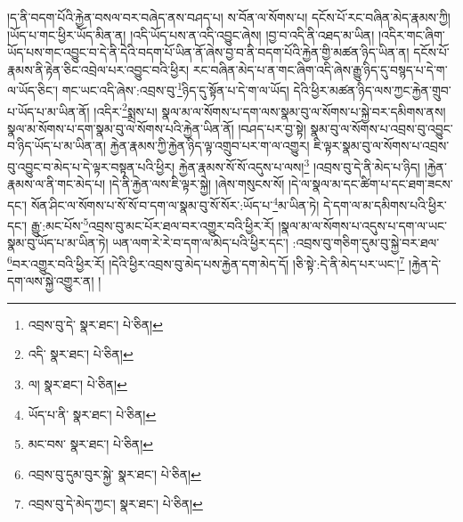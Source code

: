 །ད་ནི་བདག་པོའི་རྐྱེན་བསལ་བར་བཞེད་ནས་བཤད་པ། ས་བོན་ལ་སོགས་པ། དངོས་པོ་རང་བཞིན་མེད་རྣམས་ཀྱི། །ཡོད་པ་གང་ཕྱིར་ཡོད་མིན་ན། །འདི་ཡོད་པས་ན་འདི་འབྱུང་ཞེས། །བྱ་བ་འདི་ནི་འཐད་མ་ཡིན། །འདིར་གང་ཞིག་ཡོད་པས་གང་འབྱུང་བ་དེ་ནི་དེའི་བདག་པོ་ཡིན་ནོ་ཞེས་བྱ་བ་ནི་བདག་པོའི་རྐྱེན་གྱི་མཚན་ཉིད་ཡིན་ན། དངོས་པོ་རྣམས་ནི་རྟེན་ཅིང་འབྲེལ་པར་འབྱུང་བའི་ཕྱིར། རང་བཞིན་མེད་པ་ན་གང་ཞིག་འདི་ཞེས་རྒྱུ་ཉིད་དུ་བསྙད་པ་དེ་ག་ལ་ཡོད་ཅིང་། གང་ཡང་འདི་ཞེས་:འབྲས་བུ་\footnote{འབྲས་བུ་དེ་  སྣར་ཐང་།  པེ་ཅིན། }ཉིད་དུ་སྟོན་པ་དེ་ག་ལ་ཡོད། དེའི་ཕྱིར་མཚན་ཉིད་ལས་ཀྱང་རྐྱེན་གྲུབ་པ་ཡོད་པ་མ་ཡིན་ནོ། །འདིར་\footnote{འདི་  སྣར་ཐང་།  པེ་ཅིན། }སྨྲས་པ། སྣལ་མ་ལ་སོགས་པ་དག་ལས་སྣམ་བུ་ལ་སོགས་པ་སྐྱེ་བར་དམིགས་ནས། སྣལ་མ་སོགས་པ་དག་སྣམ་བུ་ལ་སོགས་པའི་རྐྱེན་ཡིན་ནོ། །བཤད་པར་བྱ་སྟེ། སྣམ་བུ་ལ་སོགས་པ་འབྲས་བུ་འབྱུང་བ་ཉིད་ཡོད་པ་མ་ཡིན་ན། རྐྱེན་རྣམས་ཀྱི་རྐྱེན་ཉིད་ལྟ་འགྲུབ་པར་ག་ལ་འགྱུར། ཇི་ལྟར་སྣམ་བུ་ལ་སོགས་པ་འབྲས་བུ་འབྱུང་བ་མེད་པ་དེ་ལྟར་བསྟན་པའི་ཕྱིར། རྐྱེན་རྣམས་སོ་སོ་འདུས་པ་ལས།\footnote{ལ།  སྣར་ཐང་།  པེ་ཅིན། } །འབྲས་བུ་དེ་ནི་མེད་པ་ཉིད། །རྐྱེན་རྣམས་ལ་ནི་གང་མེད་པ། །དེ་ནི་རྐྱེན་ལས་ཇི་ལྟར་སྐྱེ། །ཞེས་གསུངས་སོ། །དེ་ལ་སྣལ་མ་དང་ཚིག་པ་དང་ཐག་ཟངས་དང་། སོན་ཤིང་ལ་སོགས་པ་སོ་སོ་བ་དག་ལ་སྣམ་བུ་སོ་སོར་:ཡོད་པ་\footnote{ཡོད་པ་ནི་  སྣར་ཐང་།  པེ་ཅིན། }མ་ཡིན་ཏེ། དེ་དག་ལ་མ་དམིགས་པའི་ཕྱིར་དང་། རྒྱུ་:མང་པོས་\footnote{མང་བས་  སྣར་ཐང་།  པེ་ཅིན། }འབྲས་བུ་མང་པོར་ཐལ་བར་འགྱུར་བའི་ཕྱིར་རོ། །སྣལ་མ་ལ་སོགས་པ་འདུས་པ་དག་ལ་ཡང་སྣམ་བུ་ཡོད་པ་མ་ཡིན་ཏེ། ཡན་ལག་རེ་རེ་བ་དག་ལ་མེད་པའི་ཕྱིར་དང་། :འབྲས་བུ་གཅིག་དུམ་བུ་སྐྱེ་བར་ཐལ་\footnote{འབྲས་བུ་དུམ་བུར་སྐྱེ་  སྣར་ཐང་།  པེ་ཅིན། }བར་འགྱུར་བའི་ཕྱིར་རོ། །དེའི་ཕྱིར་འབྲས་བུ་མེད་པས་རྐྱེན་དག་མེད་དོ། །ཅི་སྟེ་:དེ་ནི་མེད་པར་ཡང་།\footnote{འབྲས་བུ་དེ་མེད་ཀྱང་།  སྣར་ཐང་།  པེ་ཅིན། } །རྐྱེན་དེ་དག་ལས་སྐྱེ་འགྱུར་ན། །
